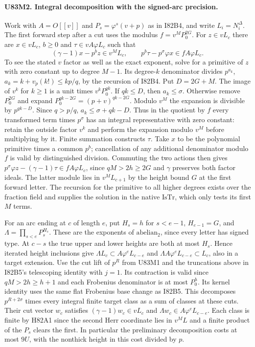 \paragraph{U83M2. Integral decomposition with the signed-arc precision.}
Work with $A=O[[v]]$ and $P_s=\varphi^s(v+p)$ as in I82B4,
and write $L_i=N_i^\Delta$. The first forward step after a cut
uses the modulus $f=v^M P_0^{2G}$. For $z\in vL_c$ there are
$x\in vL_c$, $b\ge0$ and $\tau\in v A\varphi L_c$ such that
\[
 (\gamma-1)x-p^b z\in v^M L_c,\qquad
 p^b\tau-p^\sigma\varphi x\in fA\varphi L_c.
\]
To see the stated $v$ factor as well as the exact exponent, solve
for a primitive of $z$ with zero constant up to degree $M-1$.
Its degree-$k$ denominator divides $p^{a_k}$,
$a_k=k+v_p(k!)\le kp/q$, by the recursion of I82B4.
Put $D=2G+M$. The image of $v^k$ for $k\ge1$ is a unit times
$v^kP_0^{qk}$. If $qk\le D$, then $a_k\le\sigma$. Otherwise
remove $P_0^{2G}$ and expand $P_0^{qk-2G}=(p+v)^{qk-2G}$.
Modulo $v^M$ the expansion is divisible by $p^{qk-D}$.
Since $q>p/q$, $a_k\le\sigma+qk-D$. Thus in the quotient by $f$
every transformed term times $p^\sigma$ has an integral representative
with zero constant: retain the outside factor $v^k$ and perform the
expansion modulo $v^M$ before multiplying by it. Finite summation
constructs $\tau$. Take $x$ to be the polynomial primitive times a
common $p^b$; cancellation of any additional denominator modulo $f$
is valid by distinguished division. Commuting the two actions then gives
$p^\sigma\varphi z-(\gamma-1)\tau\in f A\varphi L_c$,
since $qM>2h\ge2G$ and $\gamma$ preserves both factor ideals.
The latter module lies in $v^M L_{c+1}$ by the height bound $G$
at the first forward letter. The recursion for the primitive to
all higher degrees exists over the fraction field and supplies the
solution in the native $\mathrm{IsTr}$, which only tests its first $M$ terms.

For an arc ending at $c$ of length $e$, put
$H_s= h$ for $s< e-1$, $H_{e-1}=G$, and
$\Lambda=\prod_{s<e}P_s^{H_s}$. These are the exponents of
$\mathrm{abelian}_2$, since every letter has signed type.
At $c-s$ the true upper and lower heights are both at most $H_s$.
Hence iterated height inclusions give
$\Lambda L_c\subset A\varphi^e L_{c-e}$ and
$\Lambda A\varphi^e L_{c-e}\subset L_c$, also in a target extension.
Use the cut lift of $p^R$ from U83M1 and the truncations above in
I82B5's telescoping identity with $j=1$. Its contraction is valid
since $qM>2h\ge h+1$ and each Frobenius denominator is at most
$P_0^h$. Its kernel identity uses the same flat Frobenius base
change as I82B5. This decomposes $p^{R+2\sigma}$ times every
integral finite target class as a sum of classes at these cuts.
Their cut vector $w_c$ satisfies $(\gamma-1)w_c\in vL_c$ and
$\Lambda w_c\in A\varphi^e L_{c-e}$. Each class is finite by
H82A1 since the second Herr coordinate lies in $v^ML$ and a
finite product of the $P_s$ clears the first. In particular the
preliminary decomposition costs at most $9U$, with the nonthick
height in this cost divided by $p$.


